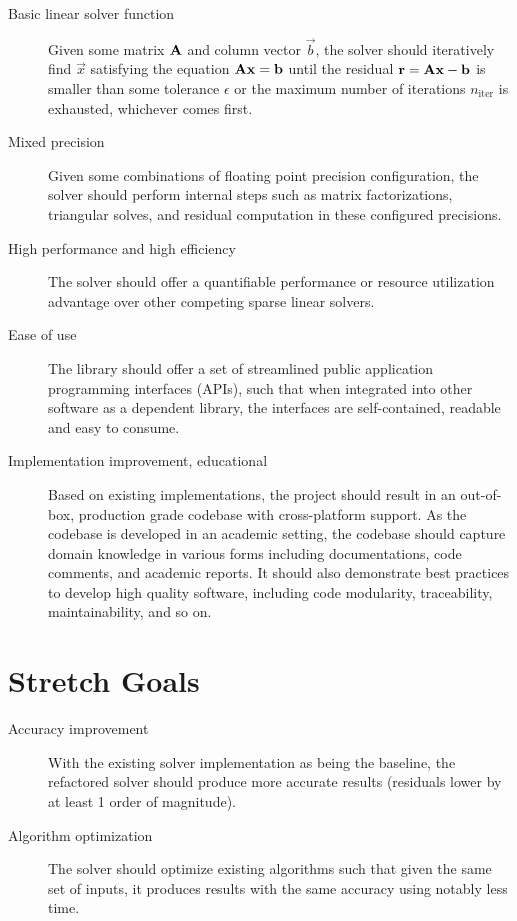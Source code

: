 \documentclass{article}
\begin{document}
\begin{description}
\item[Basic linear solver function] Given some matrix \(\mathbf{A}\) and column
  vector \(\vec{b}\), the solver should iteratively find \(\vec{x}\) satisfying
  the equation \(\mathbf{A}\mathbf{x} = \mathbf{b}\) until the residual \(\mathbf{r} =
  \mathbf{A}\mathbf{x} - \mathbf{b}\) is smaller than some tolerance \(\epsilon\) or the
  maximum number of iterations \(n_\mathrm{iter}\) is exhausted, whichever comes
  first.
\item[Mixed precision] Given some combinations of floating point precision
  configuration, the solver should perform internal steps such as matrix
  factorizations, triangular solves, and residual computation in these
  configured precisions.
\item[High performance and high efficiency] The solver should offer a quantifiable
  performance or resource utilization advantage over other competing sparse
  linear solvers.
\item[Ease of use] The library should offer a set of streamlined public application
  programming interfaces (APIs), such that when integrated into other software
  as a dependent library, the interfaces are self-contained, readable and easy
  to consume.
\item[Implementation improvement, educational] Based on existing implementations,
  the project should result in an out-of-box, production grade codebase with
  cross-platform support. As the codebase is developed in an academic setting,
  the codebase should capture domain knowledge in various forms including
  documentations, code comments, and academic reports. It should also
  demonstrate best practices to develop high quality software, including code
  modularity, traceability, maintainability, and so on.
\end{description}

\section{Stretch Goals}

\begin{description}
\item[Accuracy improvement] With the existing solver implementation
  as being the baseline, the refactored solver should produce more accurate
  results (residuals lower by at least 1 order of magnitude).
\item[Algorithm optimization] The solver should optimize existing algorithms such
  that given the same set of inputs, it produces results with the same accuracy
  using notably less time.
\end{description}
\end{document}
